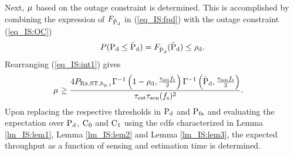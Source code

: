 {\begin{IEEEproof}
Next, $\mu^{\text{}}$ based on the outage constraint is determined. This is accomplished by combining the expression of $F_{\hat{\text{P}}_{\text{d}}}$ in (\ref{eq_IS:fpd}) with the outage constraint (\ref{eq_IS:OC}) 
\begin{align}
P(\text{P}_{\text{d}} \le \bar{\text{P}}_{\text{d}}) = F_{\hat{\text{P}}_{\text{d}}}(\bar{\text{P}}_{\text{d}}) \le \rho_{\text{d}}. 
\label{eq_IS:int1}
\end{align}
Rearranging (\ref{eq_IS:int1}) gives
\begin{align}
\mu^{\text{}} &\ge \frac{4 P_{\text{Rx,ST,$h_{\text{p,1}}$}} \Gamma^{-1} \left(1 - \rho_{\text{d}}, \frac{\tau_{\text{est}} f_{\text{s}}}{2}\right) \Gamma^{-1} \left(\bar{\text{P}}_{\text{d}}, \frac{\tau_{\text{sen}} f_{\text{s}}}{2}\right)}{ \tau_{\text{est}} \tau_{\text{sen}} (f_{\text{s}})^2  }. 
\label{eq_IS:throc}
\end{align}
 Upon replacing the respective thresholds in $\text{P}_{\text{d}}$ and $\text{P}_{\text{fa}}$ and evaluating the expectation over $\text{P}_{\text{d}}$, $\text{C}_{\text{0}}$ and $\text{C}_{\text{1}}$ using the cdfs characterized in Lemma \ref{lm_IS:lem1}, Lemma \ref{lm_IS:lem2} and Lemma \ref{lm_IS:lem3}, the expected throughput as a function of sensing and estimation time is determined. 
\end{IEEEproof}
}
